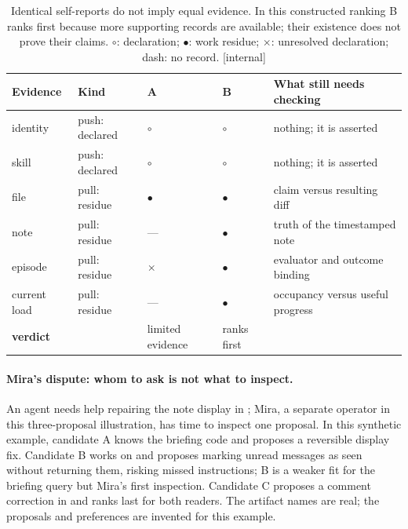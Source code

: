 \documentclass[11pt,a4paper]{article}
\theoremstyle{definition}
\theoremstyle{plain}
\begin{document}
\begin{table}[H]
\centering
\caption{Identical self-reports do not imply equal evidence. In this constructed ranking B ranks first because more supporting records are available; their existence does not prove their claims. $\circ$: declaration; $\bullet$: work residue; $\times$: unresolved declaration; dash: no record. [internal]}
\label{tab:ls-pushpull}
\small
\renewcommand{\arraystretch}{1.15}
\begin{tabularx}{\linewidth}{@{}l l >{\centering\arraybackslash}p{1.7cm} >{\centering\arraybackslash}p{1.7cm} >{\raggedright\arraybackslash}X@{}}
\toprule
\textbf{Evidence} & \textbf{Kind} & \textbf{A} & \textbf{B} & \textbf{What still needs checking} \\
\midrule
identity & push: declared & $\circ$ & $\circ$ & nothing; it is asserted \\
skill & push: declared & $\circ$ & $\circ$ & nothing; it is asserted \\
file & pull: residue & $\bullet$ & $\bullet$ & claim versus resulting diff \\
note & pull: residue & --- & $\bullet$ & truth of the timestamped note \\
episode & pull: residue & $\times$ & $\bullet$ & evaluator and outcome binding \\
current load & pull: residue & --- & $\bullet$ & occupancy versus useful progress \\
\midrule
\textbf{verdict} & & limited evidence & ranks first & \\
\bottomrule
\end{tabularx}
\end{table}

\paragraph{Mira's dispute: whom to ask is not what to inspect.}
An agent needs help repairing the note display in ;
Mira, a separate operator in this three-proposal illustration, has time to inspect one proposal. In this synthetic
example, candidate A knows the briefing code and proposes a reversible
display fix. Candidate B works on  and proposes
marking unread messages as seen without returning them, risking missed
instructions; B is a weaker fit for the briefing query but Mira's first
inspection. Candidate C proposes a comment correction in
 and ranks last for both readers. The artifact
names are real; the proposals and preferences are invented for this example.
\end{document}
